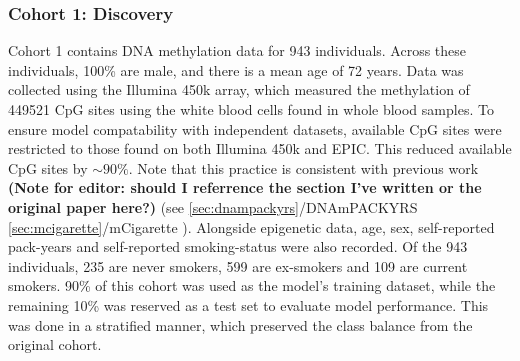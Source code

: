 \documentclass{article}
\begin{document}
\subsubsection{Cohort 1: Discovery}
Cohort 1 contains DNA methylation data for 943 individuals. Across these individuals, 100\% are male, and there is a mean age of 72 years. Data was collected using the Illumina 450k array, which measured the methylation of \num{449521} CpG sites using the white blood cells found in whole blood samples. To ensure model compatability with independent datasets, available CpG sites were restricted to those found on both Illumina 450k and EPIC. This reduced available CpG sites by \(\sim\!90\%\). Note that this practice is consistent with previous work \textbf{(Note for editor: should I referrence the section I've written or the original paper here?)} (see \ref{sec:dnampackyrs}/DNAmPACKYRS \cite{lu2019dna} \ref{sec:mcigarette}/mCigarette \cite{chybowska2025blood}). Alongside epigenetic data, age, sex, self-reported pack-years and self-reported smoking-status were also recorded. Of the 943 individuals, 235 are never smokers, 599 are ex-smokers and 109 are current smokers. 90\% of this cohort was used as the model's training dataset, while the remaining 10\% was reserved as a test set to evaluate model performance. This was done in a stratified manner, which preserved the class balance from the original cohort.

\end{document}
